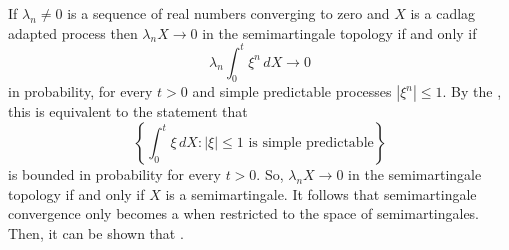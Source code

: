\documentclass[12pt]{article}
\begin{document}
If $\lambda_n\not=0$ is a sequence of real numbers converging to zero and $X$ is a cadlag adapted process then $\lambda_nX\rightarrow 0$ in the semimartingale topology if and only if
\begin{equation*}
\lambda_n\int_0^t\xi^n\,dX\rightarrow 0
\end{equation*}
in probability, for every $t>0$ and simple predictable processes $|\xi^n|\le 1$.
By the , this is equivalent to the statement that
\begin{equation*}
\left\{\int_0^t\xi\,dX:|\xi|\le 1\textrm{ is simple predictable}\right\}
\end{equation*}
is bounded in probability for every $t>0$.
So, $\lambda_nX\rightarrow 0$ in the semimartingale topology if and only if $X$ is a semimartingale. It follows that semimartingale convergence only becomes a  when restricted to the space of semimartingales. Then, it can be shown that .
\end{document}

